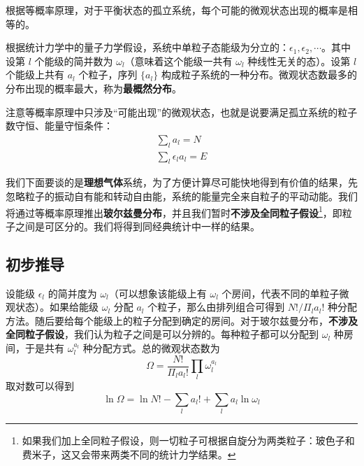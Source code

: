 

根据等概率原理，对于平衡状态的孤立系统，每个可能的微观状态出现的概率是相等的。

根据统计力学中的量子力学假设，系统中单粒子态能级为分立的：$\epsilon_1,\epsilon_2,\cdots$。其中设第 $l$ 个能级的简并数为 $\omega_l$（意味着这个能级一共有 $\omega_l$ 种线性无关的态）。设第 $l$ 个能级上共有 $a_l$ 个粒子，序列 $\{a_l\}$ 构成粒子系统的一种分布。微观状态数最多的分布出现的概率最大，称为\textbf{最概然分布}。

注意等概率原理中只涉及“可能出现”的微观状态，也就是说要满足孤立系统的粒子数守恒、能量守恒条件：
\begin{equation}\label{MBsta_eq1}
\begin{aligned}
\sum_l a_l=N\\
\sum_l \epsilon_l a_l=E
\end{aligned}
\end{equation}

我们下面要谈的是\textbf{理想气体}系统，为了方便计算尽可能快地得到有价值的结果，先忽略粒子的振动自有能和转动自由能，系统的能量完全来自粒子的平动动能。我们将通过等概率原理推出\textbf{玻尔兹曼分布}，并且我们暂时\textbf{不涉及全同粒子假设}\footnote{如果我们加上全同粒子假设，则一切粒子可根据自旋分为两类粒子：玻色子和费米子，这又会带来两类不同的统计力学结果。}，即粒子之间是可区分的。我们将得到同经典统计中一样的结果。

\subsection{初步推导}
设能级 $\epsilon_l$ 的简并度为 $\omega_l$（可以想象该能级上有 $\omega_l$ 个房间，代表不同的单粒子微观状态）。如果给能级 $\omega_l$ 分配 $a_l$ 个粒子，那么由排列组合可得到 $N!/\Pi_l a_l!$ 种分配方法。随后要给每个能级上的粒子分配到确定的房间。对于玻尔兹曼分布，\textbf{不涉及全同粒子假设}，我们认为粒子之间是可以分辨的。每种粒子都可以分配到 $\omega_l$ 种房间，于是共有 $\omega_l^{a_l}$ 种分配方式。总的微观状态数为
\begin{equation}
\Omega=\frac{N!}{\Pi_l a_l!}\prod_l\omega_l^{a_l}
\end{equation}
取对数可以得到
\begin{equation}
\ln \Omega=\ln N!-\sum_{l}a_l!+\sum_l a_l\ln \omega_l
\end{equation}

